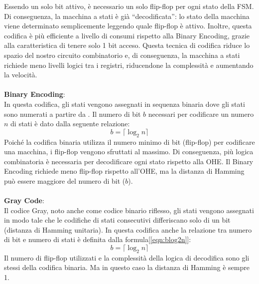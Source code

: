 \documentclass[a4paper,11pt]{article}
\newcommand\ceil[1]{\lceil#1\rceil}
\newcommand{\inctxt}[1]{\textit{\fontfamily{zi4}\selectfont #1}}
\begin{document}
Essendo un solo bit attivo, è necessario un solo flip-flop per ogni stato della FSM. Di conseguenza, la macchina a stati è già “decodificata”: lo stato della macchina viene determinato semplicemente leggendo quale flip-flop è attivo. Inoltre, questa codifica è più efficiente a livello di consumi rispetto alla Binary Encoding, grazie alla caratteristica di tenere solo 1 bit acceso. Questa tecnica di codifica riduce lo spazio del nostro circuito combinatorio e, di conseguenza, la macchina a stati richiede meno livelli logici tra i registri, riducendone la complessità e aumentando la velocità. \\
\\
\textbf{Binary Encoding}: \\
In questa codifica, gli stati vengono assegnati in sequenza binaria dove gli stati sono numerati a partire da \inctxt{0}. Il numero di bit $b$ necessari per codificare un numero $n$ di stati è dato dalla seguente relazione:
\begin{equation}
\label{eqn:blog2n}
    b = \ceil{\log_2{n}}
\end{equation}
Poiché la codifica binaria utilizza il numero minimo di bit (flip-flop) per codificare una macchina, i flip-flop vengono sfruttati al massimo. Di conseguenza, più logica combinatoria è necessaria per decodificare ogni stato rispetto alla OHE. Il Binary Encoding richiede meno flip-flop rispetto all'OHE, ma la distanza di Hamming può essere maggiore del numero di bit ($b$). \\
\\
\textbf{Gray Code}: \\
Il codice Gray, noto anche come codice binario riflesso, gli stati vengono assegnati in modo tale che le codifiche di stati consecutivi differiscano solo di un bit (distanza di Hamming unitaria). In questa codifica anche la relazione tra numero di bit e numero di stati è definita dalla formula[\ref{eqn:blog2n}]:
\begin{equation*}
    b = \ceil{\log_2{n}}
\end{equation*}
Il numero di flip-flop utilizzati e la complessità della logica di decodifica sono gli stessi della codifica binaria. Ma in questo caso la distanza di Hamming è sempre 1. \\
\\
\end{document}
